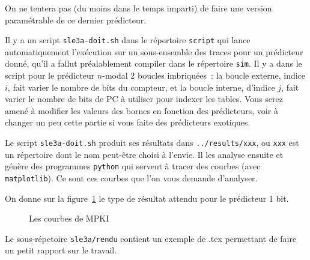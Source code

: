 \documentclass[a4paper]{article}
\begin{document}
\begin{enumerate}
      On ne tentera pas (du moins dans le temps imparti) de faire une version paramétrable de ce dernier prédicteur.
\end{enumerate}

Il y a un script \verb+sle3a-doit.sh+ dans le répertoire \verb+script+ qui lance automatiquement l'exécution sur un sous-ensemble des traces pour un prédicteur donné, qu'il a fallut préalablement compiler dans le répertoire \verb+sim+.
Il y a dans le script pour le prédicteur $n$-modal 2 boucles imbriquées~: la boucle externe, indice $i$, fait varier le nombre de bits du compteur, et la boucle interne, d'indice $j$, fait varier le nombre de bits de PC à utiliser pour indexer les tables.
Vous serez amené à modifier les valeurs des bornes en fonction des prédicteurs, voir à changer un peu cette partie si vous faite des prédicteurs exotiques.

Le script \verb+sle3a-doit.sh+ produit ses résultats dans \verb+../results/xxx+, ou \verb+xxx+ est un répertoire dont le nom peut-être choisi à l'envie.
Il les analyse ensuite et génère des programmes \texttt{python} qui servent à tracer des courbes (avec \texttt{matplotlib}).
Ce sont ces courbes que l'on vous demande d'analyser.

On donne sur la figure~\ref{results} le type de résultat attendu pour le prédicteur 1 bit.

      \begin{figure}[htb]
      \centering
      \caption{\label{results}Les courbes de MPKI}
      \end{figure}

Le sous-répetoire \verb+sle3a/rendu+ contient un exemple de .tex permettant de faire un petit rapport sur le travail.
\end{document}
